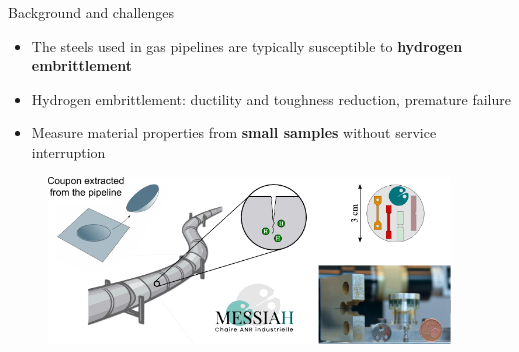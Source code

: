 \documentclass[9pt]{beamer}
\begin{document}
\begin{frame}{Background and challenges}

\begin{itemize}
	\item The steels used in gas pipelines are typically susceptible to \textbf{hydrogen embrittlement}
	\vspace{0.15cm}
	\item Hydrogen embrittlement: ductility and toughness reduction, premature failure
	\vspace{0.15cm}
	\item Measure material properties from \textbf{small samples} without service interruption
\end{itemize}

\vspace{0.15cm}

\begin{figure}
	\centering
	\includegraphics[width=0.95\textwidth]{Images/MESSIAH.pdf}
\end{figure}

\end{frame}

\end{document}
